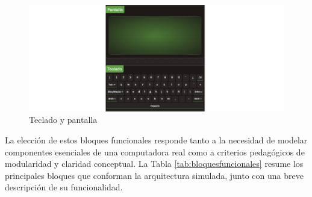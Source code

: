 \documentclass[12pt,oneside]{templates/unerthesis}
\begin{document}
\begin{figure}

{\centering \includegraphics[width=0.85\linewidth]{images/tecladopantalla} 

}

\caption{Teclado y pantalla}\label{fig:tecladopantalla}
\end{figure}

La elección de estos bloques funcionales responde tanto a la necesidad de modelar componentes esenciales de una computadora real como a criterios pedagógicos de modularidad y claridad conceptual. La Tabla \ref{tab:bloquesfuncionales} resume los principales bloques que conforman la arquitectura simulada, junto con una breve descripción de su funcionalidad.

\begin{table}[!h]
\centering
\caption{\label{tab:bloquesfuncionales}Bloques funcionales principales}
\centering
{}
\end{table}
\end{document}
